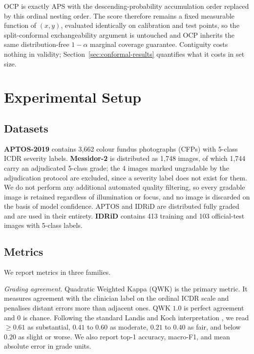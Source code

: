 \documentclass[journal]{IEEEtran}
\begin{document}
OCP is exactly APS with the descending-probability accumulation order replaced by this ordinal nesting order. The score therefore remains a fixed measurable function of $(x,y)$, evaluated identically on calibration and test points, so the split-conformal exchangeability argument is untouched and OCP inherits the same distribution-free $1-\alpha$ marginal coverage guarantee. Contiguity costs nothing in validity; Section~\ref{sec:conformal-results} quantifies what it costs in set size.

\section{Experimental Setup}
\label{sec:setup}

\subsection{Datasets}
\textbf{APTOS-2019} \cite{ref:aptos} contains 3{,}662 colour fundus photographs (CFPs) with 5-class ICDR severity labels. \textbf{Messidor-2} \cite{ref:messidor2,ref:abramoff} is distributed as 1{,}748 images, of which 1{,}744 carry an adjudicated 5-class grade; the 4 images marked ungradable by the adjudication protocol are excluded, since a severity label does not exist for them. We do not perform any additional automated quality filtering, so every gradable image is retained regardless of illumination or focus, and no image is discarded on the basis of model confidence. APTOS and IDRiD are distributed fully graded and are used in their entirety. \textbf{IDRiD} \cite{ref:idrid} contains 413 training and 103 official-test images with 5-class labels.

\subsection{Metrics}
\label{sec:metrics}
We report metrics in three families.

\textit{Grading agreement.} Quadratic Weighted Kappa (QWK) is the primary metric. It measures agreement with the clinician label on the ordinal ICDR scale and penalises distant errors more than adjacent ones. QWK $1.0$ is perfect agreement and $0$ is chance. Following the standard Landis and Koch interpretation \cite{ref:landiskoch}, we read $\geq 0.61$ as substantial, $0.41$ to $0.60$ as moderate, $0.21$ to $0.40$ as fair, and below $0.20$ as slight or worse. We also report top-1 accuracy, macro-F1, and mean absolute error in grade units.
\end{document}
